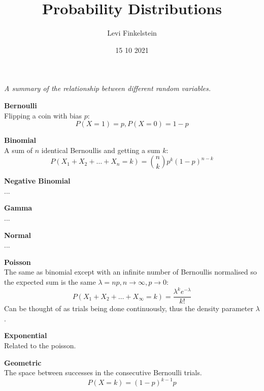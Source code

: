 \title{Probability Distributions}
\author{Levi Finkelstein}
\date{15 10 2021}


\maketitle

\textit{A summary of the relationship between different random variables.}

\textbf{Bernoulli}\\
Flipping a coin with bias $p$: 
$$P(X=1)=p, P(X=0)=1-p$$
\par

\textbf{Binomial}\\
A sum of $n$ identical Bernoullis and getting a sum $k$:
$$P(X_1 + X_2 + \dotsc + X_n = k) = \binom{n}{k}p^k (1-p)^{n-k}$$

\par
\textbf{Negative Binomial}\\
...

\par
\textbf{Gamma}\\
...

\par
\textbf{Normal}\\
...


\textbf{Poisson}\\
The same as binomial except with an infinite number of Bernoullis normalised so the expected sum is the same $\lambda = np, n\rightarrow \infty, p\rightarrow 0$:
$$P(X_1 + X_2 + \dotsc + X_\infty = k) = \frac{\lambda^{k}e^{-\lambda}}{k!}$$
Can be thought of as trials being done continuously, thus the density parameter $\lambda$.

\par
\textbf{Exponential}\\
Related to the poisson.

\textbf{Geometric}\\
The space between successes in the consecutive Bernoulli trials.
$$P(X=k)=(1-p)^{k-1}p$$



